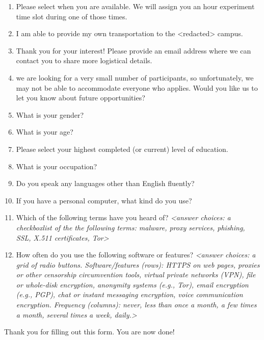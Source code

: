 \documentclass[USenglish,oneside,twocolumn]{article}
\begin{document}
\begin{enumerate}
\item{Please select when you are available. We will assign you an hour experiment time slot during one of those times.}
\item{I am able to provide my own transportation to the <redacted> %
campus.}
\item{Thank you for your interest! Please provide an email address where we can contact you to share more logistical details.}
\item{we are looking for a very small number of participants, so unfortunately, we may not be able to accommodate everyone who applies. Would you like us to let you know about future opportunities?}
\item{What is your gender?}
\item{What is your age?}
\item{Please select your highest completed (or current) level of education.}
\item{What is your occupation?} 
\item{Do you speak any languages other than English fluently?}
\item{If you have a personal computer, what kind do you use?}
\item{Which of the following terms have you heard of? \textit{<answer choices: a checkboxlist of the the following terms: malware, proxy services, phishing, SSL, X.511 certificates, Tor>}}
\item{How often do you use the following software or features? \textit{<answer choices: a grid of radio buttons. Software/features (rows): HTTPS on web pages, proxies or other censorship circumvention tools, virtual private networks (VPN), file or whole-disk encryption, anonymity systems (e.g., Tor), email encryption (e.g., PGP), chat or instant messaging encryption, voice communication encryption. Frequency (columns): never, less than once a month, a few times a month, several times a week, daily.>}}
\end{enumerate}
Thank you for filling out this form. You are now done!
\end{document}
